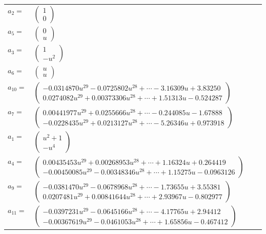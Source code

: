 \documentclass[1p]{elsarticle_modified}
\theoremstyle{definition}
\begin{document}
\begin{tabular}{m{7pt} m{180pt} m{7pt} m{180pt} }
\flushright $a_{2}=$&$\begin{pmatrix}1\\0\end{pmatrix}$ \\
\flushright $a_{5}=$&$\begin{pmatrix}0\\u\end{pmatrix}$ \\
\flushright $a_{3}=$&$\begin{pmatrix}1\\- u^2\end{pmatrix}$ \\
\flushright $a_{6}=$&$\begin{pmatrix}u\\u\end{pmatrix}$ \\
\flushright $a_{10}=$&$\begin{pmatrix}-0.0314870 u^{29}-0.0725802 u^{28}+\cdots-3.16309 u+3.83250\\0.0274082 u^{29}+0.00373306 u^{28}+\cdots+1.51313 u-0.524287\end{pmatrix}$ \\
\flushright $a_{7}=$&$\begin{pmatrix}0.00441977 u^{29}+0.0255666 u^{28}+\cdots-0.244085 u-1.67888\\-0.0228435 u^{29}+0.0213127 u^{28}+\cdots-5.26346 u+0.973918\end{pmatrix}$ \\
\flushright $a_{1}=$&$\begin{pmatrix}u^2+1\\- u^4\end{pmatrix}$ \\
\flushright $a_{4}=$&$\begin{pmatrix}0.00435453 u^{29}+0.00268953 u^{28}+\cdots+1.16324 u+0.264419\\-0.00450085 u^{29}-0.00348346 u^{28}+\cdots+1.15275 u-0.0963126\end{pmatrix}$ \\
\flushright $a_{9}=$&$\begin{pmatrix}-0.0381470 u^{29}-0.0678968 u^{28}+\cdots-1.73655 u+3.55381\\0.0207481 u^{29}+0.00841644 u^{28}+\cdots+2.93967 u-0.802977\end{pmatrix}$ \\
\flushright $a_{11}=$&$\begin{pmatrix}-0.0397231 u^{29}-0.0645166 u^{28}+\cdots-4.17765 u+2.94412\\-0.00367619 u^{29}-0.0461053 u^{28}+\cdots+1.65856 u-0.467412\end{pmatrix}$ \\

\end{tabular}
\end{document}
